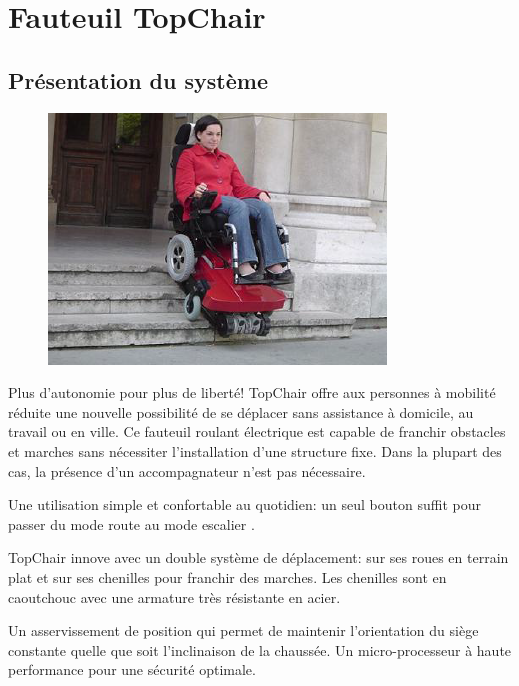 

\section{Fauteuil TopChair}
\subsection{Présentation du système}

\begin{figure}
\vspace{-7mm}
\centering \includegraphics[width=0.9\linewidth]{img/img00}
\end{figure}
Plus d'autonomie pour plus de liberté! TopChair\textregistered{} offre aux personnes à mobilité réduite une nouvelle possibilité de se déplacer sans assistance à domicile, au travail ou en ville. Ce fauteuil roulant électrique est capable de franchir obstacles et marches sans nécessiter l'installation d'une structure fixe. Dans la plupart des cas, la présence d'un accompagnateur n'est pas nécessaire.

Une utilisation simple et confortable au quotidien: un seul bouton suffit pour passer du mode \og route \fg au mode \og escalier \fg.

TopChair\textregistered{} innove avec un double système de déplacement: sur ses roues en terrain plat et sur ses chenilles pour franchir des marches. Les chenilles sont en caoutchouc avec une armature très résistante en acier.

Un asservissement de position qui permet de maintenir l'orientation du siège constante quelle que soit l'inclinaison de la chaussée. Un micro-processeur à haute performance pour une sécurité optimale.

